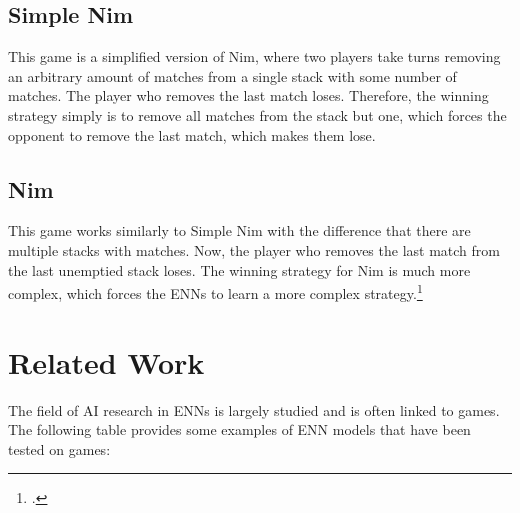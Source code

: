 \documentclass[11pt]{report}
\begin{document}
\begin{enumerate}
    \subsection{Simple Nim}\label{subsec:simple-nim}
    This game is a simplified version of Nim, where two players take turns removing an arbitrary amount of matches from a single stack with some number of matches.
    The player who removes the last match loses.
    Therefore, the winning strategy simply is to remove all matches from the stack but one, which forces the opponent to remove the last match, which makes them lose.

    \subsection{Nim}\label{subsec:nim}
    This game works similarly to Simple Nim with the difference that there are multiple stacks with matches.
    Now, the player who removes the last match from the last unemptied stack loses.
    The winning strategy for Nim is much more complex, which forces the ENNs to learn a more complex strategy.\footcite{nim_23} %


    \section{Related Work}\label{sec:related-work}
    The field of AI research in ENNs is largely studied and is often linked to games.
    The following table provides some examples of ENN models that have been tested on games:


\end{enumerate}
\end{document}

